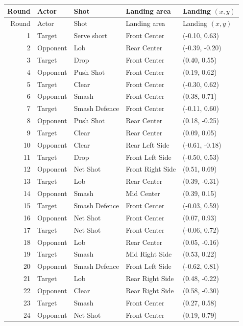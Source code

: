 \begin{longtable}{rlllp{2.1cm}}
\toprule
Round & Actor & Shot & Landing area & Landing $(x,y)$ \\
\midrule
\endfirsthead
\toprule
Round & Actor & Shot & Landing area & Landing $(x,y)$ \\
\midrule
\endhead
1 & Target & Serve short & Front Center & (-0.10, 0.63) \\
2 & Opponent & Lob & Rear Center & (-0.39, -0.20) \\
3 & Target & Drop & Front Center & (0.40, 0.55) \\
4 & Opponent & Push Shot & Front Center & (0.19, 0.62) \\
5 & Target & Clear & Front Center & (-0.30, 0.62) \\
6 & Opponent & Smash & Front Center & (0.38, 0.71) \\
7 & Target & Smash Defence & Front Center & (-0.11, 0.60) \\
8 & Opponent & Push Shot & Rear Center & (0.18, -0.25) \\
9 & Target & Clear & Rear Center & (0.09, 0.05) \\
10 & Opponent & Clear & Rear Left Side & (-0.61, -0.18) \\
11 & Target & Drop & Front Left Side & (-0.50, 0.53) \\
12 & Opponent & Net Shot & Front Right Side & (0.51, 0.69) \\
13 & Target & Lob & Rear Center & (0.39, -0.31) \\
14 & Opponent & Smash & Mid Center & (0.39, 0.15) \\
15 & Target & Smash Defence & Front Center & (-0.03, 0.59) \\
16 & Opponent & Net Shot & Front Center & (0.07, 0.93) \\
17 & Target & Net Shot & Front Center & (-0.06, 0.72) \\
18 & Opponent & Lob & Rear Center & (0.05, -0.16) \\
19 & Target & Smash & Mid Right Side & (0.53, 0.22) \\
20 & Opponent & Smash Defence & Front Left Side & (-0.62, 0.81) \\
21 & Target & Lob & Rear Right Side & (0.48, -0.22) \\
22 & Opponent & Clear & Rear Right Side & (0.58, -0.30) \\
23 & Target & Smash & Front Center & (0.27, 0.58) \\
24 & Opponent & Net Shot & Front Center & (0.19, 0.79) \\
\bottomrule
\end{longtable}

